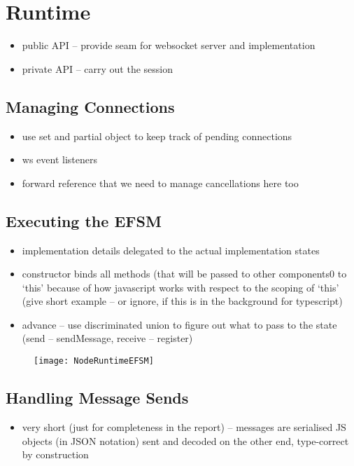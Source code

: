\section{Runtime}
\begin{itemize}
\item public API -- provide seam for websocket server and implementation
\item private API -- carry out the session
\end{itemize}

\subsection{Managing Connections}
\begin{itemize}
\item use set and partial object to keep track of pending connections
\item ws event listeners
\item forward reference that we need to manage cancellations here too
\end{itemize}

\subsection{Executing the EFSM}
\begin{itemize}
\item implementation details delegated to the actual implementation states
\item constructor binds all methods (that will be passed to other components0 to `this' because of how javascript works with respect to the scoping of `this' (give short example -- or ignore, if this is in the background for typescript)
\item advance -- use discriminated union to figure out what to pass to the state (send -- sendMessage, receive -- register)
\end{itemize}

\begin{figure}[!ht]
\centering
\texttt{[image: NodeRuntimeEFSM]}
\label{fig:noderuntimeefsm}
\end{figure}

\subsection{Handling Message Sends}
\begin{itemize}
\item very short (just for completeness in the report) -- messages are serialised JS objects (in JSON notation) sent and decoded on the other end, type-correct by construction
\end{itemize}

